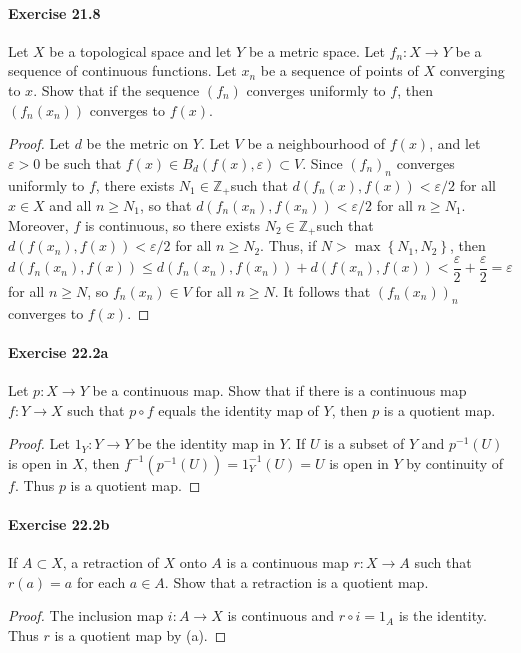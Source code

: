 \documentclass{article}
\begin{document}
\paragraph{Exercise 21.8} Let $X$ be a topological space and let $Y$ be a metric space. Let $f_{n}: X \rightarrow Y$ be a sequence of continuous functions. Let $x_{n}$ be a sequence of points of $X$ converging to $x$. Show that if the sequence $\left(f_{n}\right)$ converges uniformly to $f$, then $\left(f_{n}\left(x_{n}\right)\right)$ converges to $f(x)$.
\begin{proof}
    Let $d$ be the metric on $Y$. Let $V$ be a neighbourhood of $f(x)$, and let $\varepsilon>0$ be such that $f(x) \in B_d(f(x), \varepsilon) \subset V$. Since $\left(f_n\right)_n$ converges uniformly to $f$, there exists $N_1 \in \mathbb{Z}_{+}$such that $d\left(f_n(x), f(x)\right)<\varepsilon / 2$ for all $x \in X$ and all $n \geq N_1$, so that $d\left(f_n\left(x_n\right), f\left(x_n\right)\right)<\varepsilon / 2$ for all $n \geq N_1$. Moreover, $f$ is continuous, so there exists $N_2 \in \mathbb{Z}_{+}$such that $d\left(f\left(x_n\right), f(x)\right)<\varepsilon / 2$ for all $n \geq N_2$. Thus, if $N>\max \left\{N_1, N_2\right\}$, then
$$
d\left(f_n\left(x_n\right), f(x)\right) \leq d\left(f_n\left(x_n\right), f\left(x_n\right)\right)+d\left(f\left(x_n\right), f(x)\right)<\frac{\varepsilon}{2}+\frac{\varepsilon}{2}=\varepsilon
$$
for all $n \geq N$, so $f_n\left(x_n\right) \in V$ for all $n \geq N$. It follows that $\left(f_n\left(x_n\right)\right)_n$ converges to $f(x)$.
\end{proof}



\paragraph{Exercise 22.2a} Let $p: X \rightarrow Y$ be a continuous map. Show that if there is a continuous map $f: Y \rightarrow X$ such that $p \circ f$ equals the identity map of $Y$, then $p$ is a quotient map.
\begin{proof}
Let $1_Y: Y \rightarrow Y$ be the identity map in $Y$. If $U$ is a subset of $Y$ and $p^{-1}(U)$ is open in $X$, then $f^{-1}\left(p^{-1}(U)\right)=1_Y^{-1}(U)=U$ is open in $Y$ by continuity of $f$. Thus $p$ is a quotient map.
\end{proof}



\paragraph{Exercise 22.2b} If $A \subset X$, a retraction of $X$ onto $A$ is a continuous map $r: X \rightarrow A$ such that $r(a)=a$ for each $a \in A$. Show that a retraction is a quotient map.
\begin{proof}
The inclusion map $i: A \rightarrow X$ is continuous and $r \circ i=1_A$ is the identity. Thus $r$ is a quotient map by (a).
\end{proof}
\end{document}
